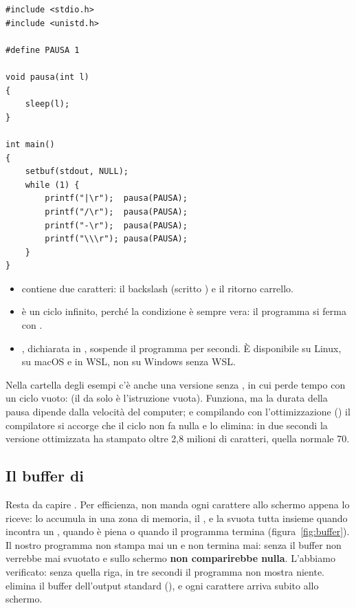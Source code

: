\begin{affianco}[0.5][c]
\begin{lstlisting}[style=c, name=spinner.c]
#include <stdio.h>
#include <unistd.h>

#define PAUSA 1

void pausa(int l)
{
    sleep(l);
}

int main()
{
    setbuf(stdout, NULL);
    while (1) {
        printf("|\r");  pausa(PAUSA);
        printf("/\r");  pausa(PAUSA);
        printf("-\r");  pausa(PAUSA);
        printf("\\\r"); pausa(PAUSA);
    }
}
\end{lstlisting}
\risultato
\begin{itemize}
  \item {} contiene due
        caratteri: il backslash (scritto \code{\textbackslash\textbackslash})
        e il ritorno carrello.
  \item {} è un ciclo infinito, perché la condizione è sempre
        vera: il programma si ferma con .
  \item {}, dichiarata in , sospende il
        programma per  secondi. È disponibile su Linux, su macOS e
        in WSL, non su Windows senza WSL.
\end{itemize}
\end{affianco}

Nella cartella degli esempi c'è anche una versione senza , in
cui  perde tempo con un ciclo vuoto:
 (il \code{;} da solo è l'istruzione vuota).
Funziona, ma la durata della pausa dipende dalla velocità del computer; e
compilando con l'ottimizzazione () il compilatore si accorge
che il ciclo non fa nulla e lo elimina: in due secondi la versione ottimizzata
ha stampato oltre 2,8 milioni di caratteri, quella normale 70.

\subsection{Il buffer di }

Resta da capire . Per efficienza, 
non manda ogni carattere allo schermo appena lo riceve: lo accumula in una
zona di memoria, il , e la svuota tutta insieme quando incontra
un , quando è piena o quando il programma termina
(figura~\ref{fig:buffer}). Il nostro programma non stampa mai un
 e non termina mai: senza  il buffer non
verrebbe mai svuotato e sullo schermo \textbf{non comparirebbe nulla}.
L'abbiamo verificato: senza quella riga, in tre secondi il programma non
mostra niente.  elimina il buffer dell'output
standard (), e ogni carattere arriva subito allo schermo.

